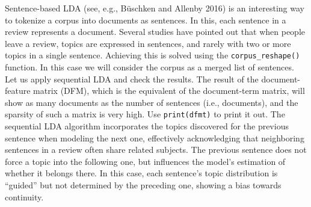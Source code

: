 Sentence-based LDA (see, e.g., Büschken and Allenby 2016) is an
interesting way to tokenize a corpus into documents as sentences. In this,
each sentence in a review represents a document. Several studies have pointed
out that when people leave a review, topics are expressed in
sentences, and rarely with two or more topics in a single sentence.
Achieving this is solved using the
\texttt{corpus\_reshape()} function. In this case we will consider the
corpus as a merged list of sentences. Let us apply sequential LDA and
check the results. The result of the document-feature matrix (DFM),
which is the equivalent of the document-term matrix, will show as many
documents as the number of sentences (i.e., documents), and the sparsity of
such a matrix is very high. Use \texttt{print(dfmt)} to print it out. The
sequential LDA algorithm incorporates the topics discovered for the
previous sentence when modeling the next one, effectively acknowledging
that neighboring sentences in a review often share related subjects. The previous sentence does not force a topic into the
following one, but influences the model's estimation of whether it belongs there. In this case, each
sentence's topic distribution is ``guided'' but not determined by the preceding one, showing a bias towards continuity.


